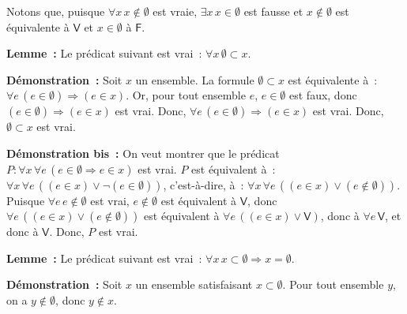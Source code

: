 Notons que, puisque $\forall x \, x \notin \emptyset$ est vraie, $\exists x \, x \in \emptyset$ est fausse et $x \notin \emptyset$ est équivalente à $\mathsf{V}$ et $x \in \emptyset$ à $\mathsf{F}$.

\medskip

\noindent\textbf{Lemme :} Le prédicat suivant est vrai : $\forall x \, \emptyset \subset x$.

\medskip

\noindent\textbf{Démonstration :} Soit $x$ un ensemble. 
    La formule $\emptyset \subset x$ est équivalente à : $\forall e \, (e \in \emptyset) \Rightarrow (e \in x)$. 
    Or, pour tout ensemble $e$, $e \in \emptyset$ est faux, donc $(e \in \emptyset) \Rightarrow (e \in x)$ est vrai.
    Donc, $\forall e \, (e \in \emptyset) \Rightarrow (e \in x)$ est vrai. 
    Donc, $\emptyset \subset x$ est vrai.

\done

\medskip

\noindent\textbf{Démonstration bis :} 
    On veut montrer que le prédicat $P: \forall x \, \forall e \, (e \in \emptyset \Rightarrow e \in x)$ est vrai. 
    $P$ est équivalent à : $\forall x \, \forall e \, ((e \in x) \vee \neg (e \in \emptyset))$, c'est-à-dire, à : $\forall x \, \forall e \, ((e \in x) \vee (e \notin \emptyset))$.
    Puisque $\forall e \, e \notin \emptyset$ est vrai, $e \notin \emptyset$ est équivalent à $\mathsf{V}$, donc $\forall e \, ((e \in x) \vee (e \notin \emptyset))$ est équivalent à $\forall e \, ((e \in x) \vee \mathsf{V})$, donc à $\forall e \, \mathsf{V}$, et donc à $\mathsf{V}$.
    Donc, $P$ est vrai. 

    \done

\medskip

\noindent\textbf{Lemme :} Le prédicat suivant est vrai : $\forall x \, x \subset \emptyset \Rightarrow x = \emptyset$.

\medskip

\noindent\textbf{Démonstration :} Soit $x$ un ensemble satisfaisant $x \subset \emptyset$.
    Pour tout ensemble $y$, on a $y \notin \emptyset$, donc $y \notin x$.
    
\done

\medskip

